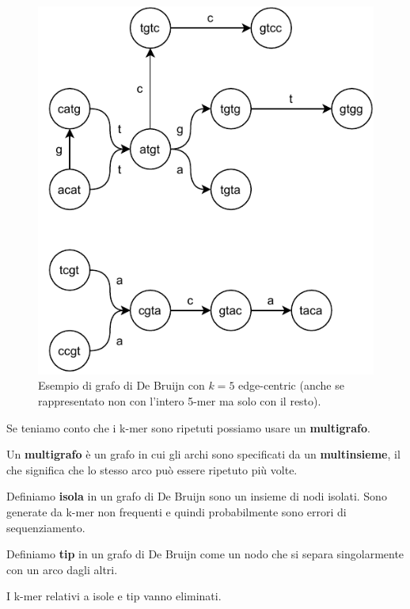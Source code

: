 \documentclass[a4paper,12pt, oneside]{book}
\begin{document}
\begin{figure}
  \centering
  \includegraphics[scale = 0.8]{img/dbg.pdf}
  \caption{Esempio di grafo di De Bruijn con $k=5$ edge-centric (anche se
    rappresentato non con l'intero 5-mer ma solo con il resto).}
\end{figure}
Se teniamo conto che i k-mer sono ripetuti possiamo usare un
\textbf{multigrafo}.
\begin{definizione}
  Un \textbf{multigrafo} è un grafo in cui gli archi sono specificati da un
  \textbf{multinsieme}, il che significa che lo stesso arco può essere ripetuto
  più volte.
\end{definizione}
\begin{definizione}
  Definiamo \textbf{isola} in un grafo di De Bruijn sono un insieme di nodi
  isolati. Sono generate da k-mer non frequenti e quindi probabilmente sono
  errori di sequenziamento.
\end{definizione}
\begin{definizione}
  Definiamo \textbf{tip} in un grafo di De Bruijn come un nodo che si separa
  singolarmente con un arco dagli altri. 
\end{definizione}
I k-mer relativi a isole e tip vanno eliminati.\\
\end{document}
